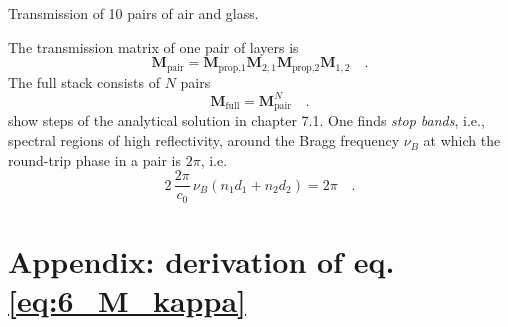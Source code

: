 \begin{marginfigure}
  \caption{Transmission of 10 pairs of air and glass.}
\end{marginfigure}

The transmission matrix of one pair of layers is
\begin{equation}
  \mathbf{M}_\text{pair}
  = 
  \mathbf{M}_\text{prop,1}    \mathbf{M}_{2,1}  \mathbf{M}_\text{prop,2}    \mathbf{M}_{1,2} \quad . 
\end{equation}
The full stack consists  of $N$ pairs
\begin{equation}
  \mathbf{M}_\text{full}
  = 
  \mathbf{M}_\text{pair}^N     \quad . 
\end{equation}
\cite{SalehTeich1991} show steps of the analytical solution in chapter 7.1. One finds \emph{stop bands}, i.e., spectral regions of high reflectivity, around the Bragg frequency $\nu_B$ at which the round-trip phase in a pair is  $2 \pi$, i.e.
\begin{equation}
  2 \, \frac{2 \pi}{c_0} \, \nu_B \left( n_1 d_1 + n_2 d_2 \right) = 2 \pi \quad . 
\end{equation}


\section{Appendix: derivation of eq. \ref{eq:6_M_kappa}}


